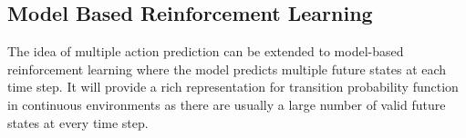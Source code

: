 \subsection{Model Based Reinforcement Learning}
The idea of multiple action prediction can be extended to model-based reinforcement learning where the model predicts multiple future states at each time step. It will provide a rich representation for transition probability function in continuous environments as there are usually a large number of valid future states at every time step.
